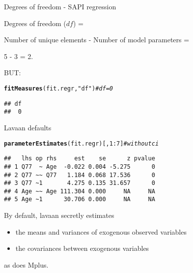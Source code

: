 \documentclass[10pt]{beamer}\usepackage[]{graphicx}\usepackage[]{xcolor}
\makeatletter
\newcommand{\hlnum}[1]{\textcolor[rgb]{0.686,0.059,0.569}{#1}}%
\newcommand{\hlsng}[1]{\textcolor[rgb]{0.192,0.494,0.8}{#1}}%
\newcommand{\hlcom}[1]{\textcolor[rgb]{0.678,0.584,0.686}{\textit{#1}}}%
\newcommand{\hlopt}[1]{\textcolor[rgb]{0,0,0}{#1}}%
\newcommand{\hldef}[1]{\textcolor[rgb]{0.345,0.345,0.345}{#1}}%
\newcommand{\hlkwd}[1]{\textcolor[rgb]{0.737,0.353,0.396}{\textbf{#1}}}%
\newenvironment{kframe}{%
 \def\at@end@of@kframe{}%
 \ifinner\ifhmode%
  \def\at@end@of@kframe{\end{minipage}}%
  \begin{minipage}{\columnwidth}%
 \fi\fi%
 \def\FrameCommand##1{\hskip\@totalleftmargin \hskip-\fboxsep
 \colorbox{shadecolor}{##1}\hskip-\fboxsep
     \hskip-\linewidth \hskip-\@totalleftmargin \hskip\columnwidth}%
 \MakeFramed {\advance\hsize-\width
   \@totalleftmargin\z@ \linewidth\hsize
   \@setminipage}}%
 {\par\unskip\endMakeFramed%
 \at@end@of@kframe}
\newenvironment{knitrout}{}{} %
\makeatother
\begin{document}
%
\begin{frame}[fragile]{Degrees of freedom - SAPI regression}

Degrees of freedom ($df$) = 

\vspace{5mm}

Number of unique elements - Number of model parameters = 

\vspace{5mm}

5 - 3 = 2.

\vspace{5mm}

BUT:\\
\begin{knitrout}
\color{fgcolor}\begin{kframe}
\begin{alltt}
\hlkwd{fitMeasures}\hldef{(fit.regr,} \hlsng{"df"}\hldef{)} \hlcom{# df = 0}
\end{alltt}
\begin{verbatim}
## df 
##  0
\end{verbatim}
\end{kframe}
\end{knitrout}

\end{frame}
%
\begin{frame}[fragile]{Lavaan defaults}

\begin{knitrout}
\color{fgcolor}\begin{kframe}
\begin{alltt}
\hlkwd{parameterEstimates}\hldef{(fit.regr)[,}\hlnum{1}\hlopt{:}\hlnum{7}\hldef{]} \hlcom{# without ci}
\end{alltt}
\begin{verbatim}
##   lhs op rhs     est    se      z pvalue
## 1 Q77  ~ Age  -0.022 0.004 -5.275      0
## 2 Q77 ~~ Q77   1.184 0.068 17.536      0
## 3 Q77 ~1       4.275 0.135 31.657      0
## 4 Age ~~ Age 111.304 0.000     NA     NA
## 5 Age ~1      30.706 0.000     NA     NA
\end{verbatim}
\end{kframe}
\end{knitrout}

By default, lavaan secretly estimates
\begin{itemize}
  \item the means and variances of exogenous observed variables
  \item the covariances between exogenous variables
\end{itemize}
as does Mplus.

\end{frame}
\end{document}
